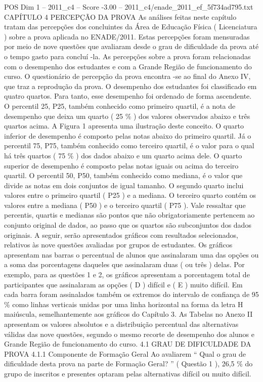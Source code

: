 \begin{textsample}{POS Dim 1 – 2011\_c4 – Score -3.00 – 2011\_c4/enade\_2011\_ef\_5f734ad795.txt}  \label{ex:f1_pos_322}
CAPÍTULO 4 PERCEPÇÃO DA PROVA As análises feitas neste capítulo tratam das percepções dos concluintes da Área de Educação Física ( Licenciatura ) sobre a prova aplicada no ENADE/2011.
Estas percepções foram mensuradas por meio de nove questões que avaliaram desde o grau de dificuldade da prova até o tempo gasto para concluí -la.
As percepções sobre a prova foram relacionadas com o desempenho dos estudantes e com a Grande Região de funcionamento do curso.
O questionário de percepção da prova encontra -se ao final do Anexo IV, que traz a reprodução da prova.
O desempenho dos estudantes foi classificado em quatro quartos.
Para tanto, esse desempenho foi ordenado de forma ascendente.
O percentil 25, P25, também conhecido como primeiro quartil, é a nota de desempenho que deixa um quarto ( 25 \% ) dos valores observados abaixo e três quartos acima.
A Figura 1 apresenta uma ilustração deste conceito.
O quarto inferior de desempenho é composto pelas notas abaixo do primeiro quartil.
Já o percentil 75, P75, também conhecido como terceiro quartil, é o valor para o qual há três quartos ( 75 \% ) dos dados abaixo e um quarto acima dele.
O quarto superior de desempenho é composto pelas notas iguais ou acima do terceiro quartil.
O percentil 50, P50, também conhecido como mediana, é o valor que divide as notas em dois conjuntos de igual tamanho.
O segundo quarto inclui valores entre o primeiro quartil ( P25 ) e a mediana.
O terceiro quarto contém os valores entre a mediana ( P50 ) e o terceiro quartil ( P75 ).
Vale ressaltar que percentis, quartis e medianas são pontos que não obrigatoriamente pertencem ao conjunto original de dados, ao passo que os quartos são subconjuntos dos dados originais.
A seguir, serão apresentados gráficos com resultados selecionados, relativos às nove questões avaliadas por grupos de estudantes.
Os gráficos apresentam nas barras o percentual de alunos que assinalaram uma das opções ou a soma das porcentagens daqueles que assinalaram duas ( ou três ) delas.
Por exemplo, para as questões 1 e 2, os gráficos apresentam a porcentagem total de participantes que assinalaram as opções ( D ) difícil e ( E ) muito difícil.
Em cada barra foram assinalados também os extremos do intervalo de confiança de 95 \% como linhas verticais unidas por uma linha horizontal na forma da letra H maiúscula, semelhantemente aos gráficos do Capítulo 3.
As Tabelas no Anexo II apresentam os valores absolutos e a distribuição percentual das alternativas válidas das nove questões, segundo o mesmo recorte de desempenho dos alunos e Grande Região de funcionamento do curso. 4.1 GRAU DE DIFICULDADE DA PROVA 4.1.1 Componente de Formação Geral Ao avaliarem “ Qual o grau de dificuldade desta prova na parte de Formação Geral? ” ( Questão 1 ), 26,5 \% do grupo de inscritos e presentes optaram pelas alternativas difícil ou muito difícil.

\end{textsample}
